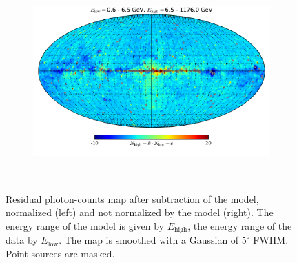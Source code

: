 \documentclass[a4paper]{article}
\begin{document}
\begin{figure}[h!]
{\begin{subfigure}[b]{.5\textwidth}
	\end{subfigure}%
	\begin{subfigure}[b]{.5\textwidth}
		\centering
		\includegraphics[width=.95\textwidth]{FitE_mollweide_at_0-6_to_6-1175.pdf}
	\end{subfigure}%
	}\\
\caption{Residual photon-counts map after subtraction of the model, normalized (left) and not normalized by the model (right). The energy range of the model is given by $E_{\text{high}}$, the energy range of the data by $E_{\text{low}}$. The map is smoothed with a Gaussian of $5^\circ$ FWHM. Point sources are masked.}
\label{Fit_IC_pi0_to_ROI}
\end{figure}
\end{document}
